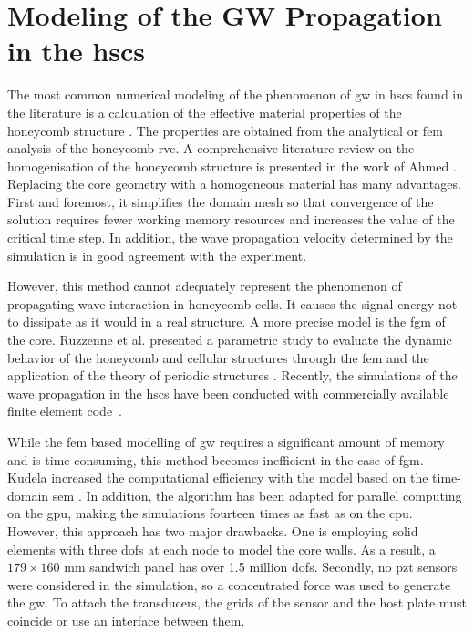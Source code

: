 \section{Modeling of the GW Propagation in the \acp{hsc}}
\label{sec:modelling}



The most common numerical modeling of the phenomenon of \ac{gw} in \acp{hsc} found in the literature is a calculation of the effective material properties of the honeycomb structure \cite{baid2015dispersion, mustapha2014leaky, qi2008ultrasonic,  shi1995derivation, sikdar2016guided}.
The properties are obtained from the analytical \cite{gibson1982mechanics, malek2015effective} or \ac{fem} \cite{catapano2014multi, chen2014analysis} analysis of the honeycomb \ac{rve}.
A comprehensive literature review on the homogenisation of the honeycomb structure is presented in the work of Ahmed \cite{ahmed2019homogenization}.
Replacing the core geometry with a homogeneous material has many advantages.
First and foremost, it simplifies the domain mesh so that convergence of the solution requires fewer working memory resources and increases the value of the critical time step.
In addition, the wave propagation velocity determined by the simulation is in good agreement with the experiment.

However, this method cannot adequately represent the phenomenon of propagating wave interaction in honeycomb cells.
It causes the signal energy not to dissipate as it would in a real structure.
A more precise model is the \ac{fgm} of the core. 
Ruzzenne et al. presented a parametric study to evaluate the dynamic behavior of the honeycomb and cellular structures through the \ac{fem} and the application of the theory of periodic structures \cite{ruzzene2003wave}.
Recently, the simulations of the wave propagation in the \acp{hsc} have been conducted with commercially available finite element code~\cite{song2009guided, hosseini2013numerical, tian2015wavenumber, zhao2018wave}.

While the \ac{fem} based modelling of \ac{gw} requires a significant amount of memory and is time-consuming, this method becomes inefficient in the case of \ac{fgm}.
Kudela increased the computational efficiency with the model based on the time-domain \ac{sem} \cite{kudela2016parallel}.
In addition, the algorithm has been adapted for parallel computing on the \ac{gpu}, making the simulations fourteen times as fast as on the \ac{cpu}.
However, this approach has two major drawbacks. One is employing solid elements with three \acp{dof} at each node to model the core walls. As a result, a $179\times160$ mm sandwich panel has over 1.5 million \acp{dof}.
Secondly, no \ac{pzt} sensors were considered in the simulation, so a concentrated force was used to generate the \ac{gw}.
To attach the transducers, the grids of the sensor and the host plate must coincide or use an interface between them. 

